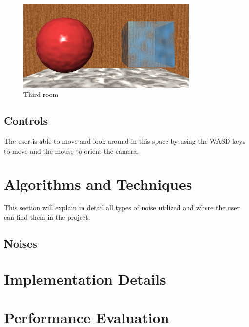 \documentclass[12pt]{article}
\begin{document}
\begin{figure}[H]
    \centering
    \includegraphics[width=0.8\textwidth]{Images/thirdRoom.png}
    \caption{Third room}
\end{figure}
\subsection {Controls}
The user is able to move and look around in this space by using the WASD keys to move and the mouse to orient the camera. 

\newpage

\section{Algorithms and Techniques}
\label{sec:algorithms}
This section will explain in detail all types of noise utilized and where the user can find them in the project.
\subsection {Noises}

\newpage

\section{Implementation Details}
\label{sec:implementation}

\newpage

\section{Performance Evaluation}
\label{sec:performance}
\end{document}

